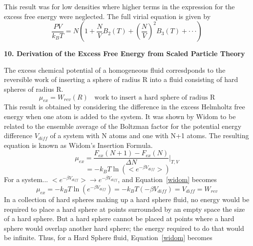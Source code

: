 \documentclass[12pt]{article}
\begin{document}
\color{red}This result was for low densities where higher terms in the expression for the excess free energy were neglected. The full virial equation is given by\color{black}
\begin{equation}\frac{PV}{k_BT}=N\left(1+\frac{N}{V}B_2(T)+\left(\frac{N}{V}\right)^2B_3(T)+ \cdot\cdot\cdot\right) \end{equation}

\[{}\]
\noindent \textbf{10. Derivation of the Excess Free Energy from Scaled Particle Theory}

The excess chemical potential of a homogeneous fluid corresdponds to the reversible work of inserting a sphere of radius R 
into a fluid consisting of hard spheres of radius R. 
\begin{displaymath}\mu_{ex}=W_{rev}(R){~~~~}\text{work to insert a hard sphere of radius R}\end{displaymath}
This result is obtained by considering the difference in the excess Helmholtz free energy when one atom is added to the system. 
It was shown by Widom to be related to the ensemble average of the Boltzman factor for the potential energy difference $V_{diff}$ 
of a system with N atoms and one with N+1 atoms. The resulting equation is known as Widom's Insertion Formula.
\begin{equation}\mu_{ex}=\frac{F_{ex}(N+1)-F_{ex}(N)}{\Delta{N}}\bigg|_{T,V}\end{equation}
\begin{equation}\label{widom}{~}=-k_BT\ln\left(<e^{-\beta{V_{diff}}}>\right)\end{equation}
\color{red}For a system... $<e^{-\beta{V_{diff}}}> \rightarrow e^{-\beta{V_{diff}}}$, and Equation~\ref{widom} becomes 
\begin{equation}\mu_{ex}=-k_BT\ln\left(e^{-\beta{V_{diff}}}\right)=-k_BT(-\beta{V}_{diff})=V_{diff}=W_{rev}\end{equation}\color{black}
\indent In a collection of hard spheres making up a hard sphere fluid, no energy would be required to place a hard sphere at points 
surrounded by an empty space the size of a hard sphere. But a hard sphere cannot be placed at points where a hard sphere would 
overlap another hard sphere; the energy required to do that would be infinite. Thus, for a Hard Sphere fluid, Equation~\ref{widom} becomes
\end{document}
